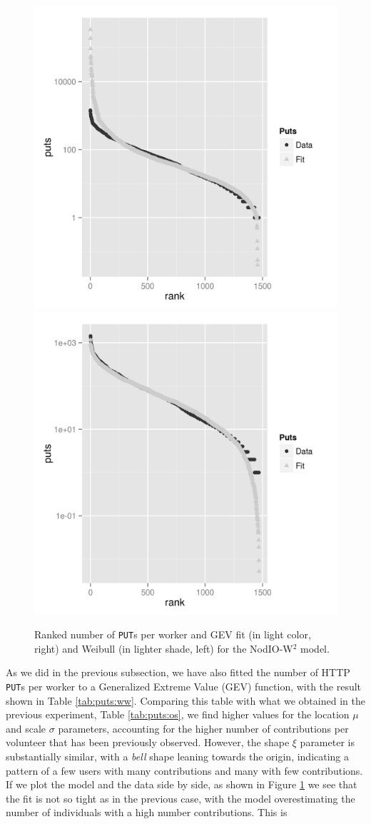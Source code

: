 \documentclass[journal,onecolumn]{IEEEtran}
\begin{document}
\begin{figure}[!htb]
\centering
\includegraphics[width=0.49\linewidth]{gev-fit-ww.png}
\includegraphics[width=0.49\linewidth]{weibull-fit-ww.png}
\caption{Ranked number of {\tt PUT}s per worker and GEV fit (in light color, right) 
and Weibull (in lighter shade, left) for the {\sf NodIO-W$^2$} model.}  
\label{fig:gev:w2}
\end{figure}
%
As we did in the previous subsection, we have also fitted the number
of HTTP {\tt PUT}s per worker to a  Generalized Extreme Value (GEV) function, with the result shown
in Table \ref{tab:puts:ww}. Comparing this table with what we obtained
in the previous experiment, Table \ref{tab:puts:os}, we find higher values
for the location $\mu$ and scale $\sigma$ parameters, accounting for
the higher number of contributions per volunteer that has been
previously observed. However, the shape $\xi$ parameter is
substantially similar, with a {\em bell} shape leaning towards the
origin, indicating a pattern of a few users with many contributions
and many with few contributions. If we plot the model and the data
side by side, as shown in Figure \ref{fig:gev:w2} we see that the fit
is not so tight as in the previous case, with the model overestimating
the number of individuals with a high number contributions. This is
\end{document}
